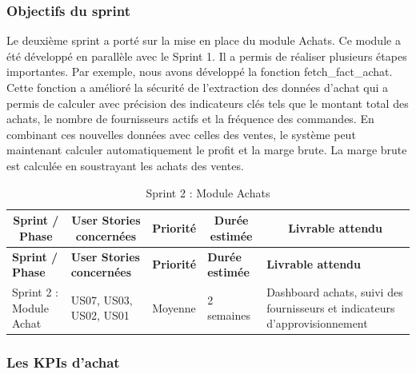 \subsubsection{Objectifs du sprint}
Le deuxième sprint a porté sur la mise en place du module Achats. Ce module a été développé en parallèle avec le Sprint 1. 
Il a permis de réaliser plusieurs étapes importantes. Par exemple, nous avons développé la fonction fetch\_fact\_achat. Cette fonction a amélioré la sécurité de l'extraction des données d'achat qui a permis de calculer avec précision des indicateurs clés tels que le montant total des achats, le nombre de fournisseurs actifs et la fréquence des commandes.
En combinant ces nouvelles données avec celles des ventes, le système peut maintenant calculer automatiquement le profit et la marge brute. La marge brute est calculée en soustrayant les achats des ventes. 

{\small
\renewcommand{\arraystretch}{1.2}
\setlength{\tabcolsep}{4pt}


\begin{longtable}{|p{3cm}|p{2.5cm}|p{1.2cm}|p{2cm}|p{4.5cm}|}

\caption{Sprint 2 : Module Achats} \\

\hline
\multicolumn{1}{|c|}{\textbf{Sprint / Phase}} & 
\multicolumn{1}{c|}{\textbf{User Stories concernées}} & 
\multicolumn{1}{c|}{\textbf{Priorité}} & 
\multicolumn{1}{c|}{\textbf{Durée estimée}} & 
\multicolumn{1}{c|}{\textbf{Livrable attendu}} \\
\hline
\endfirsthead

\hline
\textbf{Sprint / Phase} & \textbf{User Stories concernées} & \textbf{Priorité} & \textbf{Durée estimée} & \textbf{Livrable attendu} \\
\hline
\endhead

\hline
\endfoot

Sprint 2 : Module Achat & US07, US03, US02, US01 & Moyenne & 2 semaines & Dashboard achats, suivi des fournisseurs et indicateurs d'approvisionnement \\
\hline

\end{longtable}

}
\subsubsection{Les KPIs d’achat}

